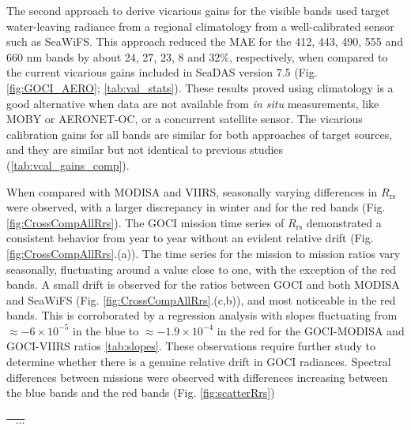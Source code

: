 \documentclass[]{interact}
\theoremstyle{plain}%
\theoremstyle{definition}
\theoremstyle{remark}
\providecommand{\DIFaddtex}[1]{{\protect\color{blue}\uwave{#1}}} %
\providecommand{\DIFdeltex}[1]{{\protect\color{red}\sout{#1}}}                      %
\providecommand{\DIFaddbegin}{} %
\providecommand{\DIFaddend}{} %
\providecommand{\DIFdelbegin}{} %
\providecommand{\DIFdelend}{} %
\providecommand{\DIFadd}[1]{\texorpdfstring{\DIFaddtex{#1}}{#1}} %
\providecommand{\DIFdel}[1]{\texorpdfstring{\DIFdeltex{#1}}{}} %
\newcommand{\DIFscaledelfig}{0.5}
\newlength{\DIFdelgraphicswidth} %
\newlength{\DIFdelgraphicsheight} %
\newcommand{\DIFaddincludegraphics}[2][]{{\color{blue}\fbox{\DIFOincludegraphics[#1]{#2}}}} %
\newcommand{\DIFdelincludegraphics}[2][]{%
\sbox{\DIFdelgraphicsbox}{\DIFOincludegraphics[#1]{#2}}%
\settoboxwidth{\DIFdelgraphicswidth}{\DIFdelgraphicsbox} %
\settoboxtotalheight{\DIFdelgraphicsheight}{\DIFdelgraphicsbox} %
\scalebox{\DIFscaledelfig}{%
\parbox[b]{\DIFdelgraphicswidth}{\usebox{\DIFdelgraphicsbox}\\[-\baselineskip] \rule{\DIFdelgraphicswidth}{0em}}\llap{\resizebox{\DIFdelgraphicswidth}{\DIFdelgraphicsheight}{%
\setlength{\unitlength}{\DIFdelgraphicswidth}%
\begin{picture}(1,1)%
\thicklines\linethickness{2pt} %
{\color[rgb]{1,0,0}\put(0,0){\framebox(1,1){}}}%
{\color[rgb]{1,0,0}\put(0,0){\line( 1,1){1}}}%
{\color[rgb]{1,0,0}\put(0,1){\line(1,-1){1}}}%
\end{picture}%
}\hspace*{3pt}}} %
} %
\DeclareRobustCommand{\DIFaddbegin}{\DIFOaddbegin \let\includegraphics\DIFaddincludegraphics} %
\DeclareRobustCommand{\DIFaddend}{\DIFOaddend \let\includegraphics\DIFOincludegraphics} %
\DeclareRobustCommand{\DIFdelbegin}{\DIFOdelbegin \let\includegraphics\DIFdelincludegraphics} %
\DeclareRobustCommand{\DIFdelend}{\DIFOaddend \let\includegraphics\DIFOincludegraphics} %
\begin{document}
The second approach to derive vicarious gains for the visible bands used target water-leaving radiance from a regional climatology from a well-calibrated sensor such as SeaWiFS. This approach reduced the MAE for the 412, 443, 490, 555 and 660 nm bands by about 24, 27, 23, 8 and 32\%, respectively, when compared to the current vicarious gains included in SeaDAS version 7.5 (Fig. \ref{fig:GOCI_AERO}; \autoref{tab:val_stats}). These results proved using climatology is a good alternative when data are not available from {\it in situ} measurements, like MOBY or AERONET-OC, or a concurrent satellite sensor. The vicarious calibration gains for all bands are similar for both approaches of target sources, and they are similar but not identical to previous studies \citep{Wang:13,Ahn2015} (\autoref{tab:vcal_gains_comp}).


When compared with MODISA and VIIRS, seasonally varying differences in $R_\text{rs}$ were observed, with a larger discrepancy in winter and for the red bands (Fig. \ref{fig:CrossCompAllRrs}). The GOCI mission time series of $R_\text{rs}$ demonstrated a consistent behavior from year to year without an evident relative drift (Fig. \ref{fig:CrossCompAllRrs}.(a)). The time series for the mission to mission ratios vary seasonally, fluctuating around a value close to one, with the exception of the red bands. A small drift is observed for the ratios between GOCI and both MODISA and SeaWiFS (Fig. \ref{fig:CrossCompAllRrs}.(c,b)), and most noticeable in the red bands. This is corroborated by a regression analysis with slopes fluctuating from \DIFdelbegin \DIFdel{$\approx-6\times10^{-5}$ }\DIFdelend \DIFaddbegin \DIFadd{$\approx-2.2\times10^{-2}$ per year }\DIFaddend in the blue to \DIFdelbegin \DIFdel{$\approx-1.9\times10^{-4}$ }\DIFdelend \DIFaddbegin \DIFadd{$\approx-6.9\times10^{-2}$ per year }\DIFaddend in the red for the GOCI-MODISA and GOCI-VIIRS ratios \DIFaddbegin \DIFadd{(}\autoref{tab:slopes}\DIFadd{)}\DIFaddend . These observations require further study to determine whether there is a genuine relative drift in GOCI radiances. Spectral differences between missions were observed with differences increasing between the blue bands and the red bands (Fig. \ref{fig:scatterRrs})

\DIFdelbegin \DIFdel{\mbox{%
\cite{Kang2010}}%
...
 }\DIFdelend %
\end{document}
